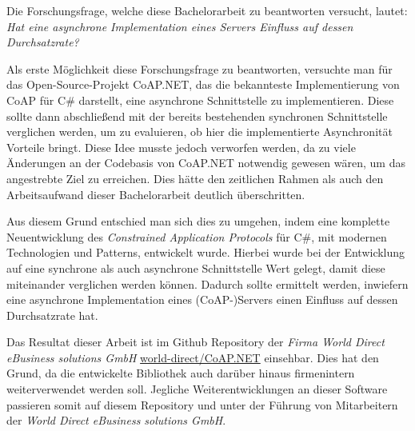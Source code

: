 Die Forschungsfrage, welche diese Bachelorarbeit zu beantworten versucht, lautet: \textit{Hat eine asynchrone Implementation eines Servers Einfluss auf dessen Durchsatzrate?}

Als erste Möglichkeit diese Forschungsfrage zu beantworten, versuchte man für das Open-Source-Projekt CoAP.NET, das die bekannteste Implementierung von CoAP für C\# darstellt, eine asynchrone Schnittstelle zu implementieren. Diese sollte dann abschließend mit der bereits bestehenden synchronen Schnittstelle verglichen werden, um zu evaluieren, ob hier die implementierte Asynchronität Vorteile bringt. Diese Idee musste jedoch verworfen werden, da zu viele Änderungen an der Codebasis von CoAP.NET notwendig gewesen wären, um das angestrebte Ziel zu erreichen. Dies hätte den zeitlichen Rahmen als auch den Arbeitsaufwand dieser Bachelorarbeit deutlich überschritten.

Aus diesem Grund entschied man sich dies zu umgehen, indem eine komplette Neuentwicklung des \textit{Constrained Application Protocols} für C\#, mit modernen Technologien und Patterns, entwickelt wurde. Hierbei wurde bei der Entwicklung auf eine synchrone als auch asynchrone Schnittstelle Wert gelegt, damit diese miteinander verglichen werden können. Dadurch sollte ermittelt werden, inwiefern eine asynchrone Implementation eines (CoAP-)Servers einen Einfluss auf dessen Durchsatzrate hat.

Das Resultat dieser Arbeit ist im Github Repository der \textit{Firma World Direct eBusiness solutions GmbH} \href{https://github.com/world-direct/CoAP.NET}{world-direct/CoAP.NET} einsehbar. Dies hat den Grund, da die entwickelte Bibliothek auch darüber hinaus firmenintern weiterverwendet werden soll. Jegliche Weiterentwicklungen an dieser Software passieren somit auf diesem Repository und unter der Führung von Mitarbeitern der \textit{World Direct eBusiness solutions GmbH}.